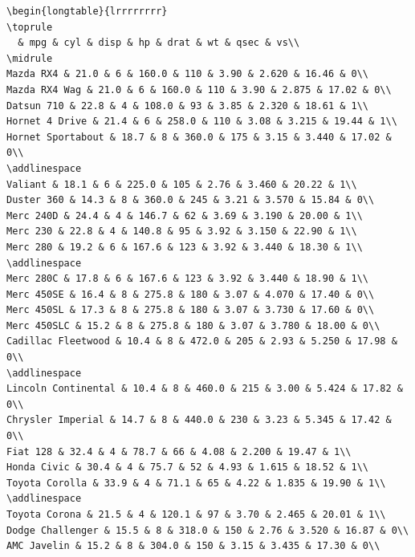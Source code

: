 \documentclass[a4paper, nobind]{templates/ociamthesis}
\begin{document}
\begin{verbatim}
\begin{longtable}{lrrrrrrrr}
\toprule
  & mpg & cyl & disp & hp & drat & wt & qsec & vs\\
\midrule
Mazda RX4 & 21.0 & 6 & 160.0 & 110 & 3.90 & 2.620 & 16.46 & 0\\
Mazda RX4 Wag & 21.0 & 6 & 160.0 & 110 & 3.90 & 2.875 & 17.02 & 0\\
Datsun 710 & 22.8 & 4 & 108.0 & 93 & 3.85 & 2.320 & 18.61 & 1\\
Hornet 4 Drive & 21.4 & 6 & 258.0 & 110 & 3.08 & 3.215 & 19.44 & 1\\
Hornet Sportabout & 18.7 & 8 & 360.0 & 175 & 3.15 & 3.440 & 17.02 & 0\\
\addlinespace
Valiant & 18.1 & 6 & 225.0 & 105 & 2.76 & 3.460 & 20.22 & 1\\
Duster 360 & 14.3 & 8 & 360.0 & 245 & 3.21 & 3.570 & 15.84 & 0\\
Merc 240D & 24.4 & 4 & 146.7 & 62 & 3.69 & 3.190 & 20.00 & 1\\
Merc 230 & 22.8 & 4 & 140.8 & 95 & 3.92 & 3.150 & 22.90 & 1\\
Merc 280 & 19.2 & 6 & 167.6 & 123 & 3.92 & 3.440 & 18.30 & 1\\
\addlinespace
Merc 280C & 17.8 & 6 & 167.6 & 123 & 3.92 & 3.440 & 18.90 & 1\\
Merc 450SE & 16.4 & 8 & 275.8 & 180 & 3.07 & 4.070 & 17.40 & 0\\
Merc 450SL & 17.3 & 8 & 275.8 & 180 & 3.07 & 3.730 & 17.60 & 0\\
Merc 450SLC & 15.2 & 8 & 275.8 & 180 & 3.07 & 3.780 & 18.00 & 0\\
Cadillac Fleetwood & 10.4 & 8 & 472.0 & 205 & 2.93 & 5.250 & 17.98 & 0\\
\addlinespace
Lincoln Continental & 10.4 & 8 & 460.0 & 215 & 3.00 & 5.424 & 17.82 & 0\\
Chrysler Imperial & 14.7 & 8 & 440.0 & 230 & 3.23 & 5.345 & 17.42 & 0\\
Fiat 128 & 32.4 & 4 & 78.7 & 66 & 4.08 & 2.200 & 19.47 & 1\\
Honda Civic & 30.4 & 4 & 75.7 & 52 & 4.93 & 1.615 & 18.52 & 1\\
Toyota Corolla & 33.9 & 4 & 71.1 & 65 & 4.22 & 1.835 & 19.90 & 1\\
\addlinespace
Toyota Corona & 21.5 & 4 & 120.1 & 97 & 3.70 & 2.465 & 20.01 & 1\\
Dodge Challenger & 15.5 & 8 & 318.0 & 150 & 2.76 & 3.520 & 16.87 & 0\\
AMC Javelin & 15.2 & 8 & 304.0 & 150 & 3.15 & 3.435 & 17.30 & 0\\

\end{verbatim}
\end{document}
